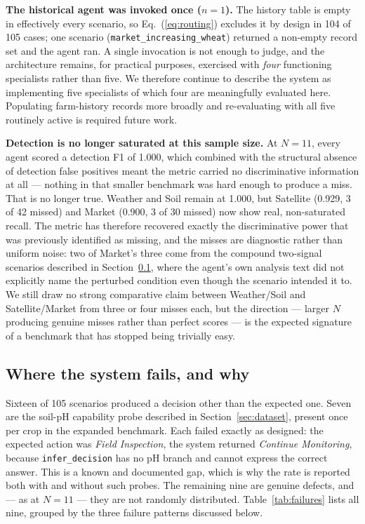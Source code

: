 \documentclass[preprint,12pt]{elsarticle}
\begin{document}
\textbf{The historical agent was invoked once ($n=1$).} The history
table is empty in effectively every scenario, so Eq.~(\ref{eq:routing})
excludes it by design in 104 of 105 cases; one scenario
(\texttt{market\_\allowbreak{}increasing\_\allowbreak{}wheat}) returned a non-empty record set and
the agent ran. A single invocation is not enough to judge, and the
architecture remains, for practical purposes, exercised with
\emph{four} functioning specialists rather than five. We therefore
continue to describe the system as implementing five specialists of
which four are meaningfully evaluated here. Populating farm-history
records more broadly and re-evaluating with all five routinely active is
required future work.

\textbf{Detection is no longer saturated at this sample size.} At
$N=11$, every agent scored a detection F1 of 1.000, which combined with
the structural absence of detection false positives meant the metric
carried no discriminative information at all --- nothing in that smaller
benchmark was hard enough to produce a miss. That is no longer true.
Weather and Soil remain at 1.000, but Satellite (0.929, 3 of 42 missed)
and Market (0.900, 3 of 30 missed) now show real, non-saturated recall.
The metric has therefore recovered exactly the discriminative power that
was previously identified as missing, and the misses are diagnostic
rather than uniform noise: two of Market's three come from the compound
two-signal scenarios described in Section~\ref{sec:failures}, where the
agent's own analysis text did not explicitly name the perturbed
condition even though the scenario intended it to. We still draw no
strong comparative claim between Weather/Soil and Satellite/Market from
three or four misses each, but the direction --- larger $N$ producing
genuine misses rather than perfect scores --- is the expected signature
of a benchmark that has stopped being trivially easy.

\subsection{Where the system fails, and why}
\label{sec:failures}

Sixteen of 105 scenarios produced a decision other than the expected one.
Seven are the soil-pH capability probe described in
Section~\ref{sec:dataset}, present once per crop in the expanded
benchmark. Each failed exactly as designed: the expected action was
\emph{Field Inspection}, the system returned \emph{Continue Monitoring},
because \texttt{infer\_decision} has no pH branch and cannot express the
correct answer. This is a known and documented gap, which is why the
rate is reported both with and without such probes. The remaining nine
are genuine defects, and --- as at $N=11$ --- they are not randomly
distributed. Table~\ref{tab:failures} lists all nine, grouped by the
three failure patterns discussed below.
\end{document}
